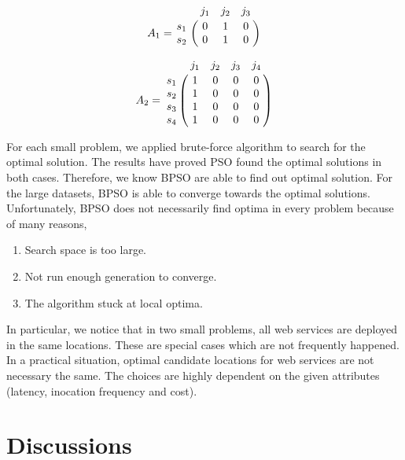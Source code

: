 \parbox{.5\linewidth}{

$$
A_1 = \bbordermatrix{~ & j_{1} & j_{2} & j_{3}\cr
					s_{1}	&0 &1 &0	\cr
					s_{2}	&0  &1 &0	\cr}
$$
}
\parbox{.5\linewidth}{

$$
A_2 = \bbordermatrix{~ & j_{1} & j_{2} & j_{3} & j_{4}\cr
					s_{1}	&1 &0 &0 &0	\cr
					s_{2}	&1  &0 &0 &0	\cr
					s_{3}	&1 &0 &0 &0	\cr
					s_{4}	&1 &0 &0 &0	\cr}
$$
}
For each small problem, we applied brute-force algorithm to search for the optimal solution.  
The results have proved PSO found the optimal solutions in both cases.
Therefore, we know BPSO are able to find out optimal solution. For the large datasets, BPSO is able to converge towards the optimal solutions. Unfortunately,
BPSO does not necessarily find optima in every problem because of many reasons,
\begin{enumerate}
	\item Search space is too large.
	\item Not run enough generation to converge.
	\item The algorithm stuck at local optima.
\end{enumerate}

In particular, we notice that in two small problems, all web services are deployed in the same locations. These are special cases which are not frequently
happened. In a practical situation, optimal candidate locations for web services are not necessary the same. 
The choices are highly dependent on the given attributes (latency, inocation frequency and cost).


\section{Discussions}
% 

